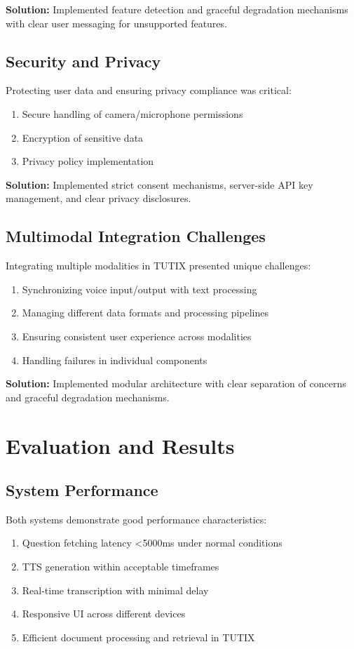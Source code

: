 \documentclass[12pt, conference]{IEEEtran}
\begin{document}
\noindent\textbf{Solution:} Implemented feature detection and graceful degradation mechanisms with clear user messaging for unsupported features.

\subsection{Security and Privacy}

Protecting user data and ensuring privacy compliance was critical:
\begin{enumerate}
    \item Secure handling of camera/microphone permissions
    \item Encryption of sensitive data
    \item Privacy policy implementation
\end{enumerate}

\noindent\textbf{Solution:} Implemented strict consent mechanisms, server-side API key management, and clear privacy disclosures.

\subsection{Multimodal Integration Challenges}

Integrating multiple modalities in TUTIX presented unique challenges:
\begin{enumerate}
    \item Synchronizing voice input/output with text processing
    \item Managing different data formats and processing pipelines
    \item Ensuring consistent user experience across modalities
    \item Handling failures in individual components
\end{enumerate}

\noindent\textbf{Solution:} Implemented modular architecture with clear separation of concerns and graceful degradation mechanisms.

\section{Evaluation and Results}

\subsection{System Performance}

Both systems demonstrate good performance characteristics:
\begin{enumerate}
    \item Question fetching latency <5000ms under normal conditions
    \item TTS generation within acceptable timeframes
    \item Real-time transcription with minimal delay
    \item Responsive UI across different devices
    \item Efficient document processing and retrieval in TUTIX
\end{enumerate}
\end{document}
